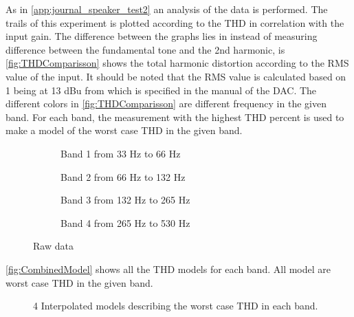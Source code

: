 As in \autoref{app:journal_speaker_test2} an analysis of the data is performed. The trails of this experiment is plotted according to the THD in correlation with the input gain. The difference between the graphs lies in instead of measuring difference between the fundamental tone and the 2nd harmonic, is \autoref{fig:THDComparisson} shows the total harmonic distortion according to the RMS value of the input. It should be noted that the RMS value is calculated based on 1 being at 13 dBu from which is specified in the manual of the DAC. The different colors in \autoref{fig:THDComparisson} are different frequency in the given band. For each band, the measurement with the highest THD percent is used to make a model of the worst case THD in the given band.


\begin{figure}[H]
\centering
\begin{subfigure}[t]{0.45\textwidth}
    \centering
    
    \caption{Band 1 from 33 Hz to 66 Hz}
    \label{fig:Band1Model}
\end{subfigure}
\begin{subfigure}[t]{0.45\textwidth}
    \centering
    
    \caption{Band 2 from 66 Hz to 132 Hz}
    \label{fig:Band2Model}
\end{subfigure}
\begin{subfigure}[t]{0.45\textwidth}
    \centering
    
    \caption{Band 3 from 132 Hz to 265 Hz}
    \label{fig:Band3Model}
\end{subfigure}
\begin{subfigure}[t]{0.45\textwidth}
    \centering
    
    \caption{Band 4 from 265 Hz to 530 Hz}
    \label{fig:Band4Model}
\end{subfigure}
\caption{Raw data}
\label{fig:THDComparisson}
\end{figure} 

\autoref{fig:CombinedModel} shows all the THD models for each band. All model are worst case THD in the given band.

\begin{figure}[H]
    \centering
    
    \caption{4 Interpolated models describing the worst case THD in each band.}
    \label{fig:CombinedModel}
\end{figure}

